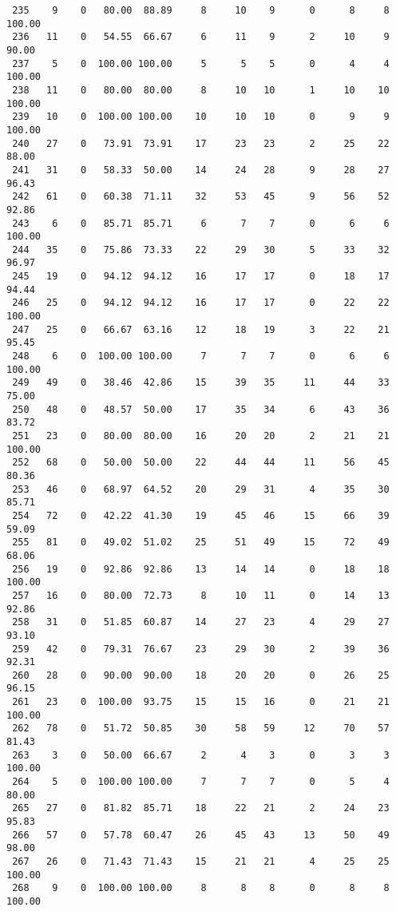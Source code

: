 \begin{verbatim}
 235    9    0   80.00  88.89     8     10    9      0      8     8   100.00
 236   11    0   54.55  66.67     6     11    9      2     10     9    90.00
 237    5    0  100.00 100.00     5      5    5      0      4     4   100.00
 238   11    0   80.00  80.00     8     10   10      1     10    10   100.00
 239   10    0  100.00 100.00    10     10   10      0      9     9   100.00
 240   27    0   73.91  73.91    17     23   23      2     25    22    88.00
 241   31    0   58.33  50.00    14     24   28      9     28    27    96.43
 242   61    0   60.38  71.11    32     53   45      9     56    52    92.86
 243    6    0   85.71  85.71     6      7    7      0      6     6   100.00
 244   35    0   75.86  73.33    22     29   30      5     33    32    96.97
 245   19    0   94.12  94.12    16     17   17      0     18    17    94.44
 246   25    0   94.12  94.12    16     17   17      0     22    22   100.00
 247   25    0   66.67  63.16    12     18   19      3     22    21    95.45
 248    6    0  100.00 100.00     7      7    7      0      6     6   100.00
 249   49    0   38.46  42.86    15     39   35     11     44    33    75.00
 250   48    0   48.57  50.00    17     35   34      6     43    36    83.72
 251   23    0   80.00  80.00    16     20   20      2     21    21   100.00
 252   68    0   50.00  50.00    22     44   44     11     56    45    80.36
 253   46    0   68.97  64.52    20     29   31      4     35    30    85.71
 254   72    0   42.22  41.30    19     45   46     15     66    39    59.09
 255   81    0   49.02  51.02    25     51   49     15     72    49    68.06
 256   19    0   92.86  92.86    13     14   14      0     18    18   100.00
 257   16    0   80.00  72.73     8     10   11      0     14    13    92.86
 258   31    0   51.85  60.87    14     27   23      4     29    27    93.10
 259   42    0   79.31  76.67    23     29   30      2     39    36    92.31
 260   28    0   90.00  90.00    18     20   20      0     26    25    96.15
 261   23    0  100.00  93.75    15     15   16      0     21    21   100.00
 262   78    0   51.72  50.85    30     58   59     12     70    57    81.43
 263    3    0   50.00  66.67     2      4    3      0      3     3   100.00
 264    5    0  100.00 100.00     7      7    7      0      5     4    80.00
 265   27    0   81.82  85.71    18     22   21      2     24    23    95.83
 266   57    0   57.78  60.47    26     45   43     13     50    49    98.00
 267   26    0   71.43  71.43    15     21   21      4     25    25   100.00
 268    9    0  100.00 100.00     8      8    8      0      8     8   100.00

\end{verbatim}
